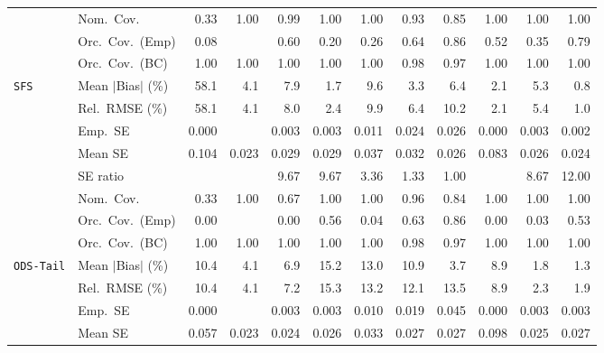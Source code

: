 \begin{landscape}
\begin{longtable}{llrrrrrrrrrr}
 & Nom.\ Cov. & 0.33 & 1.00 & \cellcolor{ranktwo}0.99 & 1.00 & \cellcolor{rankthree}1.00 & \cellcolor{rankone}0.93 & 0.85 & 1.00 & 1.00 & 1.00 \\
 & Orc.\ Cov.\ (Emp) & 0.08 &  & 0.60 & 0.20 & 0.26 & \cellcolor{rankthree}0.64 & \cellcolor{rankone}0.86 & 0.52 & 0.35 & \cellcolor{ranktwo}0.79 \\
 & Orc.\ Cov.\ (BC) & 1.00 & 1.00 & 1.00 & 1.00 & \cellcolor{rankthree}1.00 & \cellcolor{ranktwo}0.98 & \cellcolor{rankone}0.97 & 1.00 & 1.00 & 1.00 \\
\addlinespace[2pt]
\quad \texttt{SFS} & Mean $|$Bias$|$ (\%) & 58.1 & 4.1 & 7.9 & \cellcolor{ranktwo}1.7 & 9.6 & 3.3 & 6.4 & \cellcolor{rankthree}2.1 & 5.3 & \cellcolor{rankone}0.8 \\
 & Rel.\ RMSE (\%) & 58.1 & 4.1 & 8.0 & \cellcolor{rankthree}2.4 & 9.9 & 6.4 & 10.2 & \cellcolor{ranktwo}2.1 & 5.4 & \cellcolor{rankone}1.0 \\
 & Emp.\ SE & 0.000 &  & 0.003 & 0.003 & 0.011 & 0.024 & 0.026 & 0.000 & 0.003 & 0.002 \\
 & Mean SE & 0.104 & 0.023 & 0.029 & 0.029 & 0.037 & 0.032 & 0.026 & 0.083 & 0.026 & 0.024 \\
 & SE ratio &  &  & 9.67 & 9.67 & \cellcolor{rankthree}3.36 & \cellcolor{ranktwo}1.33 & \cellcolor{rankone}1.00 &  & 8.67 & 12.00 \\
 & Nom.\ Cov. & 0.33 & \cellcolor{rankthree}1.00 & 0.67 & 1.00 & \cellcolor{ranktwo}1.00 & \cellcolor{rankone}0.96 & 0.84 & 1.00 & 1.00 & 1.00 \\
 & Orc.\ Cov.\ (Emp) & 0.00 &  & 0.00 & \cellcolor{rankthree}0.56 & 0.04 & \cellcolor{ranktwo}0.63 & \cellcolor{rankone}0.86 & 0.00 & 0.03 & 0.53 \\
 & Orc.\ Cov.\ (BC) & \cellcolor{rankthree}1.00 & 1.00 & 1.00 & 1.00 & 1.00 & \cellcolor{ranktwo}0.98 & \cellcolor{rankone}0.97 & 1.00 & 1.00 & 1.00 \\
\addlinespace[2pt]
\quad \texttt{ODS-Tail} & Mean $|$Bias$|$ (\%) & 10.4 & 4.1 & 6.9 & 15.2 & 13.0 & 10.9 & \cellcolor{rankthree}3.7 & 8.9 & \cellcolor{ranktwo}1.8 & \cellcolor{rankone}1.3 \\
 & Rel.\ RMSE (\%) & 10.4 & \cellcolor{rankthree}4.1 & 7.2 & 15.3 & 13.2 & 12.1 & 13.5 & 8.9 & \cellcolor{ranktwo}2.3 & \cellcolor{rankone}1.9 \\
 & Emp.\ SE & 0.000 &  & 0.003 & 0.003 & 0.010 & 0.019 & 0.045 & 0.000 & 0.003 & 0.003 \\
 & Mean SE & 0.057 & 0.023 & 0.024 & 0.026 & 0.033 & 0.027 & 0.027 & 0.098 & 0.025 & 0.027 \\

\end{longtable}
\end{landscape}
